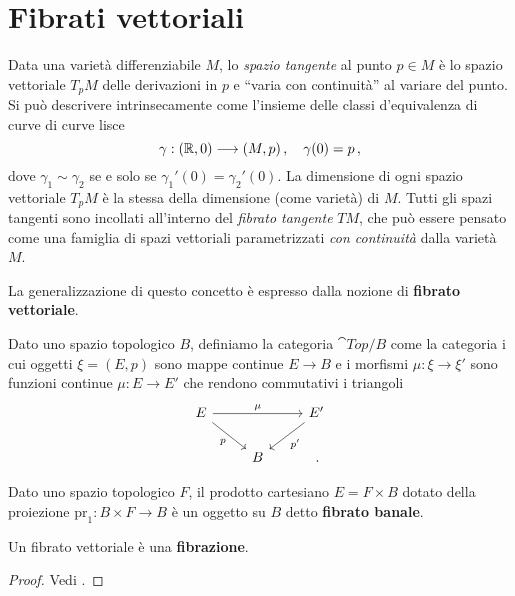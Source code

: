 
\chapter{Fibrati vettoriali}



Data una varietà differenziabile $M$, lo \emph{spazio tangente} al punto $p \in M$
è lo spazio vettoriale $T_{p}M$ delle derivazioni in $p$ e ``varia con continuità''
al variare del punto. Si può descrivere intrinsecamente
come l'insieme delle classi d'equivalenza di curve di curve lisce
\begin{equation*}
	\gamma : ({\mathbb R},0) \longrightarrow (M,p)\,, \quad \gamma(0) = p\,,
\end{equation*}
dove $\gamma_{1} \sim \gamma_{2}$ se e solo se $\gamma_{1}'(0) = \gamma_{2}'(0)$.
La dimensione di ogni spazio vettoriale $T_{p}M$ è 
la stessa della dimensione (come varietà) di $M$.
Tutti gli spazi tangenti sono incollati all'interno
del \emph{fibrato tangente} $TM$, che può essere pensato come
una famiglia di spazi vettoriali 
parametrizzati \emph{con continuità} dalla varietà $M$.

La generalizzazione di questo concetto è espresso dalla nozione
di \textbf{fibrato vettoriale}.

\begin{df}
	Dato uno spazio topologico $B$, definiamo la categoria $\cat{Top}/B$
	come la categoria i cui oggetti $\xi = (E,p)$ sono mappe continue $E \to B$
	e i morfismi $\mu : \xi \to \xi'$ sono
	funzioni continue $\mu :E \to E'$ che rendono commutativi i triangoli
	\begin{equation*}
		\begin{tikzcd}
			E \ar[rr, "\mu"] \ar[dr, "p"'] & & E' \ar[dl,, "p'"] \\
			& B & \,.
		\end{tikzcd}
	\end{equation*}
\end{df}

\begin{ex}
	Dato uno spazio topologico $F$, il prodotto cartesiano $E = F \times B$
	dotato della proiezione $\mathrm{pr}_{1}:B \times F \to B$ è un
	oggetto su $B$ detto \textbf{fibrato banale}.
\end{ex}

\begin{thm}
	Un fibrato vettoriale è una \textbf{fibrazione}.
	\begin{proof}
		Vedi \parencite[Proposition~4.48]{hatcher}.
	\end{proof}
\end{thm}

